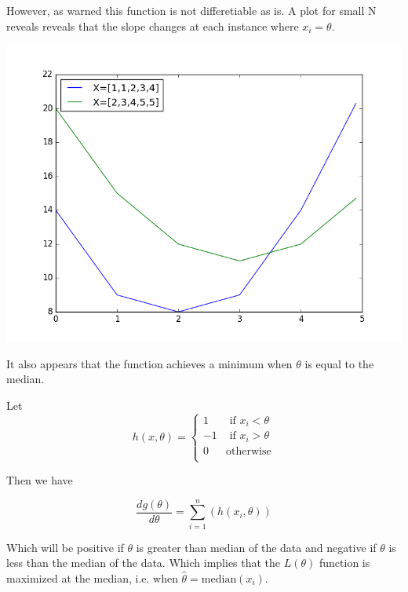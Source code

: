 \documentclass{tufte-book}
\theoremstyle{mytheoremstyle}
\theoremstyle{mylemstyle}
\theoremstyle{mydefstyle}
\begin{document}
However, as warned this function is not differetiable as is.  A plot for small N reveals reveals that the slope changes at each instance where $x_i=\theta$.

\includegraphics{q8.png}

It also appears that the function achieves a minimum when $\theta$ is equal to the median.

Let
\[ h(x, \theta) =
\begin{cases}
1 &\text { if }  x_i < \theta \\
-1 &\text { if } x_i > \theta \\
0 &\text {otherwise}\\
\end{cases}
\]

Then we have

\[ \frac{d g(\theta)}{d\theta} = \sum_{i=1}^n(h(x_i, \theta)) \]

Which will be positive if $\theta$ is greater than median of the data and negative if $\theta$ is less than the median of the data.  Which implies that the $L(\theta)$ function is maximized at the median, i.e. when $\hat{\theta} = \text{median}(x_i)$.
\end{document}
